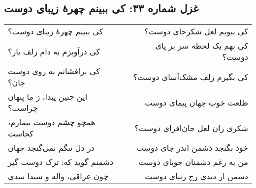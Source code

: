 \begin{center}
\section*{غزل شماره ۳۳: کی ببینم چهرهٔ زیبای دوست}
\label{sec:033}
\begin{longtable}{l p{0.5cm} r}
کی ببینم چهرهٔ زیبای دوست؟
&&
کی ببویم لعل شکرخای دوست؟
\\
کی درآویزم به دام زلف یار؟
&&
کی نهم یک لحظه سر بر پای دوست؟
\\
کی برافشانم به روی دوست جان؟
&&
کی بگیرم زلف مشک‌آسای دوست؟
\\
این چنین پیدا، ز ما پنهان چراست؟
&&
طلعت خوب جهان پیمای دوست
\\
همچو چشم دوست بیمارم، کجاست
&&
شکری زان لعل جان‌افزای دوست؟
\\
در دل تنگم نمی‌گنجد جهان
&&
خود نگنجد دشمن اندر جای دوست
\\
دشمنم گوید که: ترک دوست گیر
&&
من به رغم دشمنان جویای دوست
\\
چون عراقی، واله و شیدا شدی
&&
دشمن ار دیدی رخ زیبای دوست
\\
\end{longtable}
\end{center}
